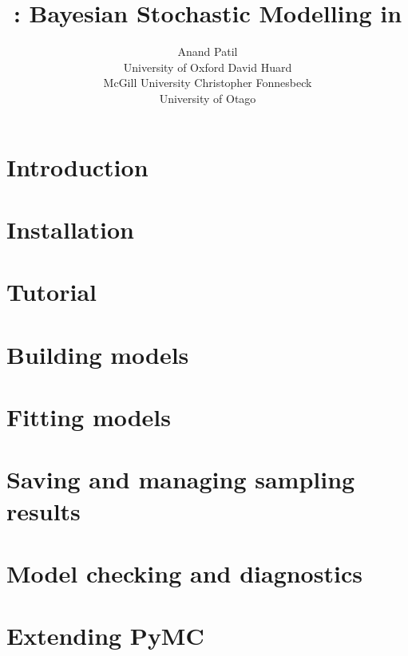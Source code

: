 \documentclass[]{jss_mod}
\author{Anand Patil\\University of Oxford \And
        David Huard\\McGill University  \And
		Christopher Fonnesbeck\\University of Otago}
\title{\pkg{PyMC} : Bayesian Stochastic Modelling in \proglang{Python}}
\begin{document}
\maketitle

\tableofcontents
\cleardoublepage
{}

\section[Introduction]{Introduction}
\label{chap:intro}


\section[Installation]{Installation}
\label{chap:install}


\section[Tutorial]{Tutorial}
\label{chap:tutorial}


\section[Building Models]{Building models}
\label{chap:modelbuilding}


\section[Fitting Models]{Fitting models}
\label{chap:modelfitting}


\section[Sampling Results]{Saving and managing sampling results}
\label{chap:database}


\section[Model Checking]{Model checking and diagnostics}
\label{chap:modelchecking}


\section[Extending PyMC]{Extending PyMC}
\label{chap:extending}

\clearpage
\end{document}
